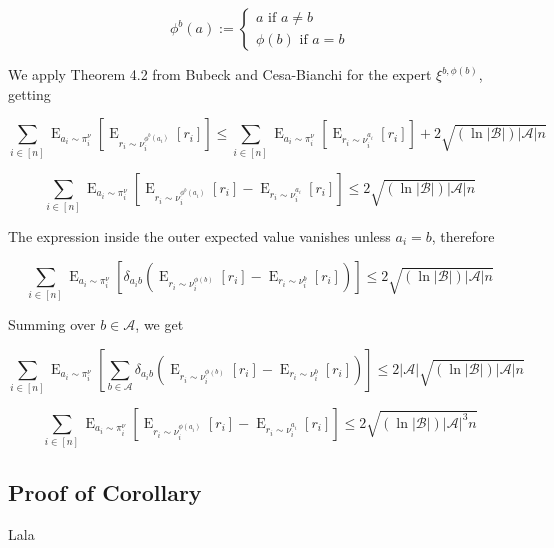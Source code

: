 \documentclass[a4paper]{article}
\DeclareMathOperator{\E}{E}
\newcommand{\Abs}[1]{\lvert #1 \rvert}
\newcommand{\Act}{\mathcal{A}}
\newcommand{\ActCh}{\mathcal{B}}
\begin{document}
$$\phi^b(a):=\begin{cases}a \text{ if } a \ne b \\ \phi(b) \text{ if } a = b \end{cases}$$

We apply Theorem 4.2 from Bubeck and Cesa-Bianchi for the expert ${\xi^{b,\phi(b)}}$, getting

$$\sum_{i \in [n]} \E_{a_i \sim \pi_i^\nu}[\E_{r_i \sim \nu_i^{\phi^b(a_i)}} [r_i]] \leq \sum_{i \in [n]} \E_{a_i \sim \pi_i^\nu}[\E_{r_i \sim \nu_i^{a_i}} [r_i]] + 2\sqrt{(\ln \Abs{\ActCh}) \Abs{\Act} n}$$

$$\sum_{i \in [n]} \E_{a_i \sim \pi_i^\nu}[\E_{r_i \sim \nu_i^{\phi^b(a_i)}} [r_i] - \E_{r_i \sim \nu_i^{a_i}} [r_i]] \leq 2\sqrt{(\ln \Abs{\ActCh}) \Abs{\Act} n}$$

The expression inside the outer expected value vanishes unless ${a_i=b}$, therefore

$$\sum_{i \in [n]} \E_{a_i \sim \pi_i^\nu}[\delta_{a_ib} (\E_{r_i \sim \nu_i^{\phi(b)}} [r_i] - \E_{r_i \sim \nu_i^b} [r_i])] \leq 2\sqrt{(\ln \Abs{\ActCh}) \Abs{\Act} n}$$

Summing over ${b \in \Act}$, we get

$$\sum_{i \in [n]} \E_{a_i \sim \pi_i^\nu}[\sum_{b \in \Act} \delta_{a_ib} (\E_{r_i \sim \nu_i^{\phi(b)}} [r_i] - \E_{r_i \sim \nu_i^b} [r_i])] \leq 2 \Abs{\Act} \sqrt{(\ln \Abs{\ActCh}) \Abs{\Act} n}$$

$$\sum_{i \in [n]} \E_{a_i \sim \pi_i^\nu}[\E_{r_i \sim \nu_i^{\phi(a_i)}} [r_i]-\E_{r_i \sim \nu_i^{a_i}} [r_i]] \leq 2\sqrt{(\ln \Abs{\ActCh}) \Abs{\Act}^3 n}$$

\subsection{Proof of Corollary}

Lala
\end{document}
